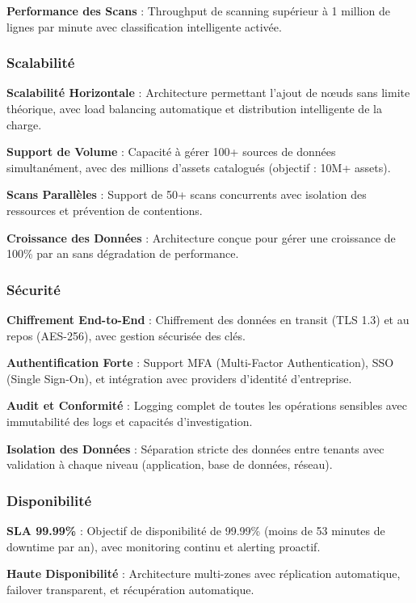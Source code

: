 \textbf{Performance des Scans} : Throughput de scanning supérieur à 1 million de lignes par minute avec classification intelligente activée.

\subsubsection{Scalabilité}

\textbf{Scalabilité Horizontale} : Architecture permettant l'ajout de nœuds sans limite théorique, avec load balancing automatique et distribution intelligente de la charge.

\textbf{Support de Volume} : Capacité à gérer 100+ sources de données simultanément, avec des millions d'assets catalogués (objectif : 10M+ assets).

\textbf{Scans Parallèles} : Support de 50+ scans concurrents avec isolation des ressources et prévention de contentions.

\textbf{Croissance des Données} : Architecture conçue pour gérer une croissance de 100\% par an sans dégradation de performance.

\subsubsection{Sécurité}

\textbf{Chiffrement End-to-End} : Chiffrement des données en transit (TLS 1.3) et au repos (AES-256), avec gestion sécurisée des clés.

\textbf{Authentification Forte} : Support MFA (Multi-Factor Authentication), SSO (Single Sign-On), et intégration avec providers d'identité d'entreprise.

\textbf{Audit et Conformité} : Logging complet de toutes les opérations sensibles avec immutabilité des logs et capacités d'investigation.

\textbf{Isolation des Données} : Séparation stricte des données entre tenants avec validation à chaque niveau (application, base de données, réseau).

\subsubsection{Disponibilité}

\textbf{SLA 99.99\%} : Objectif de disponibilité de 99.99\% (moins de 53 minutes de downtime par an), avec monitoring continu et alerting proactif.

\textbf{Haute Disponibilité} : Architecture multi-zones avec réplication automatique, failover transparent, et récupération automatique.

